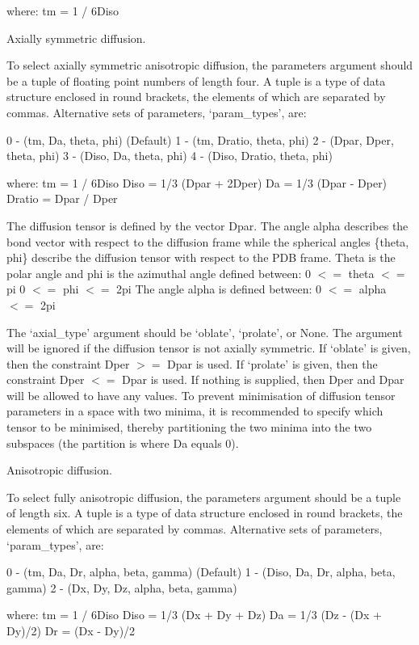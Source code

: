 where:
    tm = 1 / 6Diso


Axially symmetric diffusion.

To select axially symmetric anisotropic diffusion, the parameters argument should be a tuple
of floating point numbers of length four.  A tuple is a type of data structure enclosed in
round brackets, the elements of which are separated by commas.  Alternative sets of
parameters, `param\_types', are:

    0 - (tm, Da, theta, phi)   (Default)
    1 - (tm, Dratio, theta, phi)
    2 - (Dpar, Dper, theta, phi)
    3 - (Diso, Da, theta, phi)
    4 - (Diso, Dratio, theta, phi)

where:
    tm = 1 / 6Diso
    Diso = 1/3 (Dpar + 2Dper)
    Da = 1/3 (Dpar - Dper)
    Dratio = Dpar / Dper

The diffusion tensor is defined by the vector Dpar.  The angle alpha describes the bond
vector with respect to the diffusion frame while the spherical angles \{theta, phi\} describe
the diffusion tensor with respect to the PDB frame.  Theta is the polar angle and phi is the
azimuthal angle defined between:
    0 $<=$ theta $<=$ pi
    0 $<=$ phi $<=$ 2pi
The angle alpha is defined between:
    0 $<=$ alpha $<=$ 2pi

The `axial\_type' argument should be `oblate', `prolate', or None.  The argument will be
ignored if the diffusion tensor is not axially symmetric.  If `oblate' is given, then the
constraint Dper $>=$ Dpar is used.  If `prolate' is given, then the constraint Dper $<=$ Dpar is
used.  If nothing is supplied, then Dper and Dpar will be allowed to have any values.  To
prevent minimisation of diffusion tensor parameters in a space with two minima, it is
recommended to specify which tensor to be minimised, thereby partitioning the two minima
into the two subspaces (the partition is where Da equals 0).


Anisotropic diffusion.

To select fully anisotropic diffusion, the parameters argument should be a tuple of length
six.  A tuple is a type of data structure enclosed in round brackets, the elements of which
are separated by commas.  Alternative sets of parameters, `param\_types', are:

    0 - (tm, Da, Dr, alpha, beta, gamma)   (Default)
    1 - (Diso, Da, Dr, alpha, beta, gamma)
    2 - (Dx, Dy, Dz, alpha, beta, gamma)

where:
    tm = 1 / 6Diso
    Diso = 1/3 (Dx + Dy + Dz)
    Da = 1/3 (Dz - (Dx + Dy)/2)
    Dr = (Dx - Dy)/2

